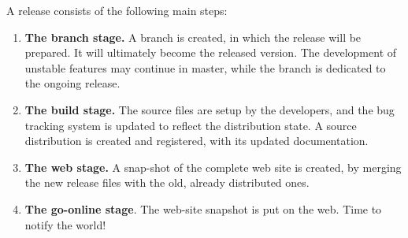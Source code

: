 A \FramaC release consists of the following main steps:
\begin{enumerate}

\item \textbf{The branch stage.} A branch is created, in which the release
  will be prepared. It will ultimately become the released version.
  The development of unstable features may continue in master, while the
  branch is dedicated to the ongoing release.

\item \textbf{The build stage.} The source files are setup by the
  developers, and the bug tracking system is updated to reflect the
  distribution state. A source distribution is created and registered,
  with its updated documentation.

\item \textbf{The web stage.} A snap-shot of the complete web site is
  created, by merging the new release files with the old,
  already distributed ones. %

\item \textbf{The go-online stage}. The web-site snapshot is put on
  the web. Time to notify the world!

\end{enumerate}



